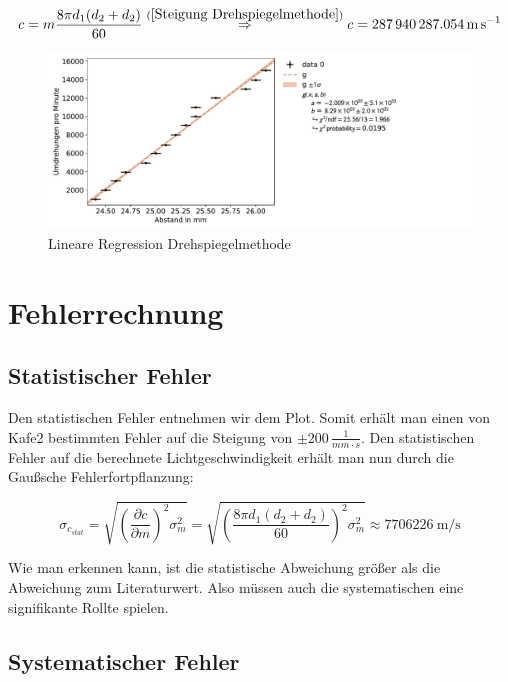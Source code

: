 \begin{equation}
    c = m \frac{8 \pi d_1 (d_2+d_2)}{60}  \stackrel{(\ref{Steigung Drehspiegelmethode})}{\Rightarrow} c = \SI{287940287.054}{\metre\per\second}
\end{equation}

\begin{figure}[ht]
    \centering
    \includegraphics[scale=0.45]{Lichtgeschwindigkeit/Protokoll/fig/Drehspiegelmethode.pdf}
    \caption{Lineare Regression Drehspiegelmethode}
    \label{fig:Drehspiegelmethode Anpassung}
\end{figure}

\section{Fehlerrechnung}

\subsection{Statistischer Fehler}

Den statistischen Fehler entnehmen wir dem Plot. Somit erhält man einen von Kafe2 bestimmten Fehler auf die Steigung von $\pm 200 \, \frac{1}{mm \cdot s}$. Den statistischen Fehler auf die berechnete Lichtgeschwindigkeit erhält man nun durch die Gaußsche Fehlerfortpflanzung:

\begin{equation}
    \sigma_{c_{stat}} = \sqrt{(\frac{\partial c }{\partial m})^2 \sigma_m^2} = \sqrt{( \frac{8 \pi d_1 (d_2+d_2)}{60})^2 \sigma_m^2} \approx \SI{7706226}{\metre\per\second}
\end{equation}

Wie man erkennen kann, ist die statistische Abweichung größer als die Abweichung zum Literaturwert. Also müssen auch die systematischen eine signifikante Rollte spielen. 

\subsection{Systematischer Fehler}

